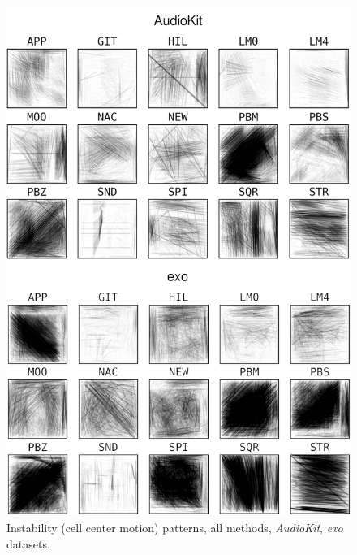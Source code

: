 \begin{figure}[htbp!]
\includegraphics[width=\textwidth]{figures/treemap-algorithm/centroid-4a.png}
\caption{Instability (cell center motion) patterns, all methods, \emph{AudioKit}, \emph{exo} datasets.}
\label{fig:centroids}
\end{figure}

